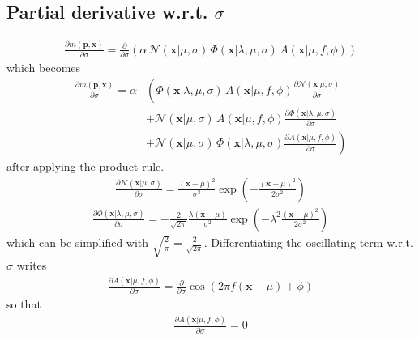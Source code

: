 \documentclass{article}
\begin{document}
\subsection{Partial derivative w.r.t. $\sigma$}
\begin{align}
\frac{\partial m\left(\mathbf{p},\mathbf{x}\right)}{\partial \sigma} = \frac{\partial}{\partial \sigma}\left(\alpha\,\mathcal{N}(\mathbf{x}|\mu,\sigma) \, \Phi(\mathbf{x}|\lambda,\mu,\sigma) \, A(\mathbf{x}|\mu,f,\phi)\right)
\end{align}
which becomes
\begin{align}
\frac{\partial m\left(\mathbf{p},\mathbf{x}\right)}{\partial \sigma} = \alpha&\left(\Phi(\mathbf{x}|\lambda,\mu,\sigma) \, A(\mathbf{x}|\mu,f,\phi) \frac{\partial \mathcal{N}(\mathbf{x}|\mu,\sigma)}{\partial \sigma} \right. \\ 
&+ \mathcal{N}(\mathbf{x}|\mu,\sigma) \, A(\mathbf{x}|\mu,f,\phi) \frac{\partial \Phi(\mathbf{x}|\lambda,\mu,\sigma)}{\partial \sigma} \\
&+ \left. \mathcal{N}(\mathbf{x}|\mu,\sigma) \, \Phi(\mathbf{x}|\lambda,\mu,\sigma) \frac{\partial A(\mathbf{x}|\mu,f,\phi)}{\partial \sigma} \right)
\end{align}
after applying the product rule.
\begin{align}
\frac{\partial \mathcal{N}(\mathbf{x}|\mu,\sigma)}{\partial \sigma} = \frac{(\mathbf{x}-\mu)^2}{\sigma^3} \exp\left(-\frac{(\mathbf{x}-\mu)^2}{2\sigma^2}\right)
\end{align}
\begin{align}
\frac{\partial\Phi(\mathbf{x}|\lambda,\mu,\sigma)}{\partial\sigma}=-\frac{2}{\sqrt{2\pi}}\frac{\lambda(\mathbf{x}-\mu)}{\sigma^2}\exp\left(-\lambda^2\frac{(\mathbf{x}-\mu)^2}{2\sigma^2}\right)
\end{align}
which can be simplified with $\sqrt{\frac{2}{\pi}}=\frac{2}{\sqrt{2\pi}}$. Differentiating the oscillating term w.r.t. $\sigma$ writes
\begin{align}
\frac{\partial A(\mathbf{x}|\mu,f,\phi)}{\partial \sigma} = \frac{\partial}{\partial\sigma} \cos\left(2 \pi f \left(\mathbf{x} - \mu\right) + \phi\right)
\end{align}
so that
\begin{align}
\frac{\partial A(\mathbf{x}|\mu,f,\phi)}{\partial \sigma} = 0
\end{align}
%
\end{document}
